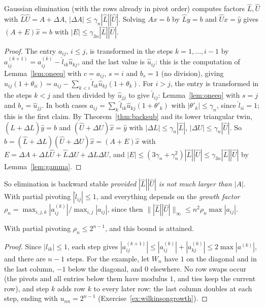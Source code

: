 \begin{theorem}[Wilkinson, 1961]\label{thm:geerror}
Gaussian elimination (with the rows already in pivot order) computes factors $\hat L,\hat U$ with $\hat L\hat U=A+\Delta A$, $|\Delta A|\le\gamma_n|\hat L||\hat U|$.
Solving $Ax=b$ by $\hat Ly=b$ and $\hat Ux=\hat y$ gives $(A+E)\hat x=b$ with $|E|\le\gamma_{3n}|\hat L||\hat U|$.
\end{theorem}
\begin{proof}
The entry $a_{ij}$, $i\le j$, is transformed in the steps $k=1,\dots,i-1$ by $a_{ij}^{(k+1)}=a_{ij}^{(k)}-\hat l_{ik}\hat u_{kj}$, and the last value is
$\hat u_{ij}$: this is the computation of Lemma~\ref{lem:oneeq} with $c=a_{ij}$, $s=i$ and $b_s=1$ (no division), giving
$\hat u_{ij}(1+\theta_{ii})=a_{ij}-\sum_{k<i}\hat l_{ik}\hat u_{kj}(1+\theta_k)$. For $i>j$, the entry is transformed in the steps $k<j$ and then divided by
$\hat u_{jj}$ to give $\hat l_{ij}$: Lemma~\ref{lem:oneeq} with $s=j$ and $b_s=\hat u_{jj}$. In both cases $a_{ij}=\sum_k\hat l_{ik}\hat u_{kj}(1+\theta'_{k})$
with $|\theta'_k|\le\gamma_n$, since $\hat l_{ii}=1$; this is the first claim. By Theorem~\ref{thm:backsub} and its lower triangular twin,
$(\hat L+\Delta L)\hat y=b$ and $(\hat U+\Delta U)\hat x=\hat y$ with $|\Delta L|\le\gamma_n|\hat L|$, $|\Delta U|\le\gamma_n|\hat U|$. So
$b=(\hat L+\Delta L)(\hat U+\Delta U)\hat x=(A+E)\hat x$ with $E=\Delta A+\Delta L\hat U+\hat L\Delta U+\Delta L\Delta U$, and
$|E|\le(3\gamma_n+\gamma_n^2)|\hat L||\hat U|\le\gamma_{3n}|\hat L||\hat U|$ by Lemma~\ref{lem:gamma}.
\end{proof}

So elimination is backward stable \emph{provided $|\hat L||\hat U|$ is not much larger than $|A|$}. With partial pivoting $|\hat l_{ij}|\le1$, and everything
depends on the \emph{growth factor} $\rho_n=\max_{i,j,k}|a^{(k)}_{ij}|/\max_{i,j}|a_{ij}|$, since then
$\||\hat L||\hat U|\|_\infty\le n^2\rho_n\max|a_{ij}|$.

\begin{proposition}[growth]\label{prop:growth}
With partial pivoting $\rho_n\le2^{n-1}$, and this bound is attained.
\end{proposition}
\begin{proof}
Since $|l_{ik}|\le1$, each step gives $|a_{ij}^{(k+1)}|\le|a_{ij}^{(k)}|+|a_{kj}^{(k)}|\le2\max|a^{(k)}|$, and there are $n-1$ steps. For the example, let $W_n$ have
$1$ on the diagonal and in the last column, $-1$ below the diagonal, and $0$ elsewhere. No row swaps occur (the pivots and all entries below them have modulus
$1$, and ties keep the current row), and step $k$ adds row $k$ to every later row: the last column doubles at each step, ending with $u_{nn}=2^{n-1}$
(Exercise~\ref{ex:wilkinsongrowth}).
\end{proof}

